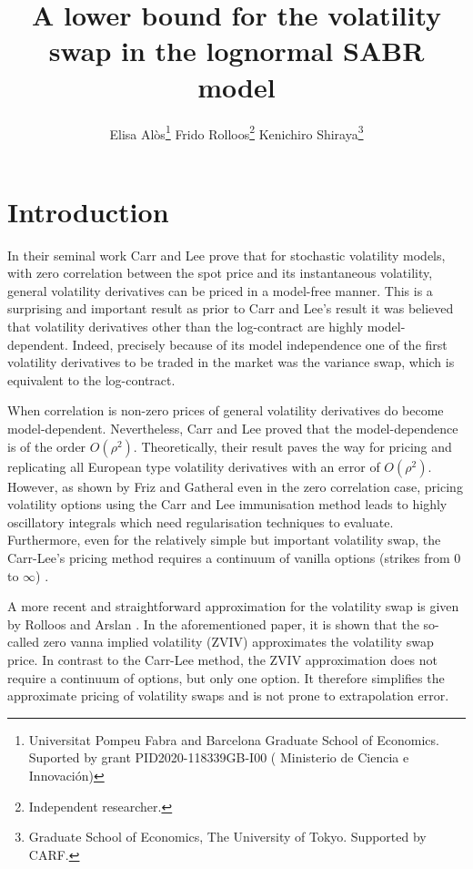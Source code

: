 \documentclass[11pt]{article}
\title{A lower bound for the volatility swap in the lognormal SABR model}
\author{Elisa Al\`os\thanks{Universitat Pompeu Fabra and Barcelona Graduate School of Economics. Suported by grant  PID2020-118339GB-I00  ( Ministerio de Ciencia e Innovaci\'on)} \quad Frido Rolloos\thanks{Independent researcher.} \quad Kenichiro Shiraya\thanks{Graduate School of Economics, The University of Tokyo. Supported by CARF.}}
\begin{document}
\maketitle



\section{Introduction}
In their seminal work Carr and Lee \cite{CL1} prove that for stochastic volatility models, with zero correlation between the spot price and its instantaneous volatility, general volatility derivatives can be priced in a model-free manner. This is a surprising and important result as prior to Carr and Lee's result it was believed that volatility derivatives other than the log-contract are highly model-dependent. Indeed, precisely because of its model independence one of the first volatility derivatives to be traded in the market was the variance swap, which is equivalent to the log-contract.

When correlation is non-zero prices of general volatility derivatives do become model-dependent. Nevertheless, Carr and Lee proved that the model-dependence is of the order $O(\rho^2)$. Theoretically, their result paves the way for pricing and replicating all European type volatility derivatives with an error of $O(\rho^2)$. However, as shown by Friz and Gatheral \cite{FG} even in the zero correlation case, pricing volatility options using the Carr and Lee immunisation method leads to highly oscillatory integrals which need regularisation techniques to evaluate. Furthermore, even for the relatively simple but important volatility swap, the Carr-Lee's pricing method requires a continuum of vanilla options (strikes from $0$ to $\infty$) . 

A more recent and straightforward approximation for the volatility swap is given by Rolloos and Arslan \cite{RA}. In the aforementioned paper, it is shown that the so-called zero vanna implied volatility (ZVIV) approximates the volatility swap price. In contrast to the Carr-Lee method, the ZVIV approximation does not require a continuum of options, but only one option. It therefore simplifies the approximate pricing of volatility swaps and is not prone to extrapolation error.
\end{document}
